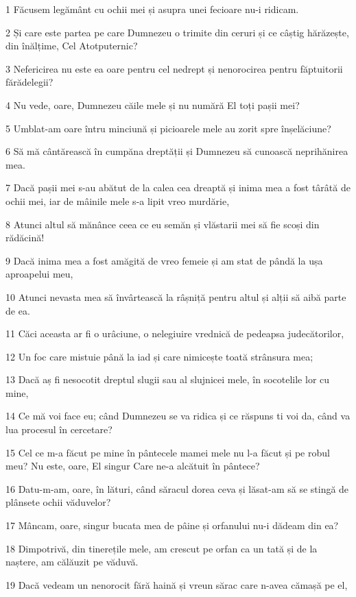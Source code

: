 \par 1 Făcusem legământ cu ochii mei și asupra unei fecioare nu-i ridicam.
\par 2 Și care este partea pe care Dumnezeu o trimite din ceruri și ce câștig hărăzește, din înălțime, Cel Atotputernic?
\par 3 Nefericirea nu este ea oare pentru cel nedrept și nenorocirea pentru făptuitorii fărădelegii?
\par 4 Nu vede, oare, Dumnezeu căile mele și nu numără El toți pașii mei?
\par 5 Umblat-am oare întru minciună și picioarele mele au zorit spre înșelăciune?
\par 6 Să mă cântărească în cumpăna dreptății și Dumnezeu să cunoască neprihănirea mea.
\par 7 Dacă pașii mei s-au abătut de la calea cea dreaptă și inima mea a fost târâtă de ochii mei, iar de mâinile mele s-a lipit vreo murdărie,
\par 8 Atunci altul să mănânce ceea ce eu semăn și vlăstarii mei să fie scoși din rădăcină!
\par 9 Dacă inima mea a fost amăgită de vreo femeie și am stat de pândă la ușa aproapelui meu,
\par 10 Atunci nevasta mea să învârtească la râșniță pentru altul și alții să aibă parte de ea.
\par 11 Căci aceasta ar fi o urâciune, o nelegiuire vrednică de pedeapsa judecătorilor,
\par 12 Un foc care mistuie până la iad și care nimicește toată strânsura mea;
\par 13 Dacă aș fi nesocotit dreptul slugii sau al slujnicei mele, în socotelile lor cu mine,
\par 14 Ce mă voi face eu; când Dumnezeu se va ridica și ce răspuns ti voi da, când va lua procesul în cercetare?
\par 15 Cel ce m-a făcut pe mine în pântecele mamei mele nu l-a făcut și pe robul meu? Nu este, oare, El singur Care ne-a alcătuit în pântece?
\par 16 Datu-m-am, oare, în lături, când săracul dorea ceva și lăsat-am să se stingă de plânsete ochii văduvelor?
\par 17 Mâncam, oare, singur bucata mea de pâine și orfanului nu-i dădeam din ea?
\par 18 Dimpotrivă, din tinerețile mele, am crescut pe orfan ca un tată și de la naștere, am călăuzit pe văduvă.
\par 19 Dacă vedeam un nenorocit fără haină și vreun sărac care n-avea cămașă pe el,
